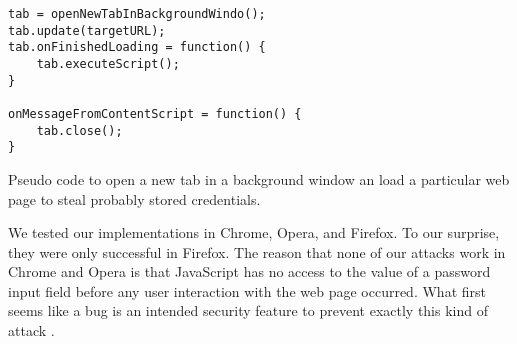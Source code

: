 	\begin{code}
		\begin{lstlisting}
tab = openNewTabInBackgroundWindo();
tab.update(targetURL);
tab.onFinishedLoading = function() {
	tab.executeScript();
}

onMessageFromContentScript = function() {
	tab.close();
}
\end{lstlisting}
		\caption{Pseudo code to open a new tab in a background window an load a particular web page to steal probably stored credentials.}
		\label{backgroundOpenPageInNewBackgroundTab}
	\end{code}
			
	We tested our implementations in Chrome, Opera, and Firefox. To our surprise, they were only successful in Firefox. The reason that none of our attacks work in Chrome and Opera is that JavaScript has no access to the value of a password input field before any user interaction with the web page occurred. What first seems like a bug is an intended security feature to prevent exactly this kind of attack \cite{chromiumBlogPasswordInput}.
